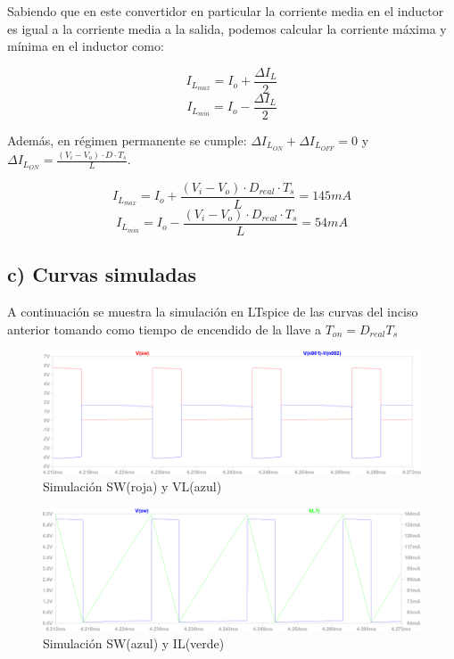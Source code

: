 \documentclass[e4_tp1_main.tex]{subfiles}
\begin{document}
Sabiendo que en este convertidor en particular la corriente media en el inductor es igual a la corriente media a la salida, podemos calcular la corriente m\'axima y m\'inima en el inductor como:

$$I_{L_{max}}= I_o + \frac{\Delta I_L}{2}$$
$$I_{L_{min}}= I_o - \frac{\Delta I_L}{2}$$

Adem\'as, en r\'egimen permanente se cumple: $\Delta I_{L_{ON}}+\Delta I_{L_{OFF}}=0$ y $\Delta I_{L_{ON}}=\frac{(V_i-V_o)\cdot D\cdot T_s}{L}$.

$$I_{L_{max}}= I_o + \frac{(V_i-V_o)\cdot D_{real}\cdot T_s}{L}=145mA$$
$$I_{L_{min}}= I_o - \frac{(V_i-V_o)\cdot D_{real}\cdot T_s}{L}=54mA$$

\newpage

\subsection*{c) Curvas simuladas}

A continuaci\'on se muestra la simulaci\'on en LTspice de las curvas del inciso anterior tomando como tiempo de encendido de la llave a $T_{on}=D_{real}T_s$


\begin{figure}[H]
  \centering
    \includegraphics[scale = 0.6]{Imagenes/punto2/SW&VL}
  \caption{Simulaci\'on SW(roja) y VL(azul)}
  \label{fig:SW&VL}
\end{figure}

\begin{figure}[H]
  \centering
    \includegraphics[scale = 0.6]{Imagenes/punto2/SW&IL}
  \caption{Simulaci\'on SW(azul) y IL(verde)}
  \label{fig:SW&IL}
\end{figure}
\end{document}
